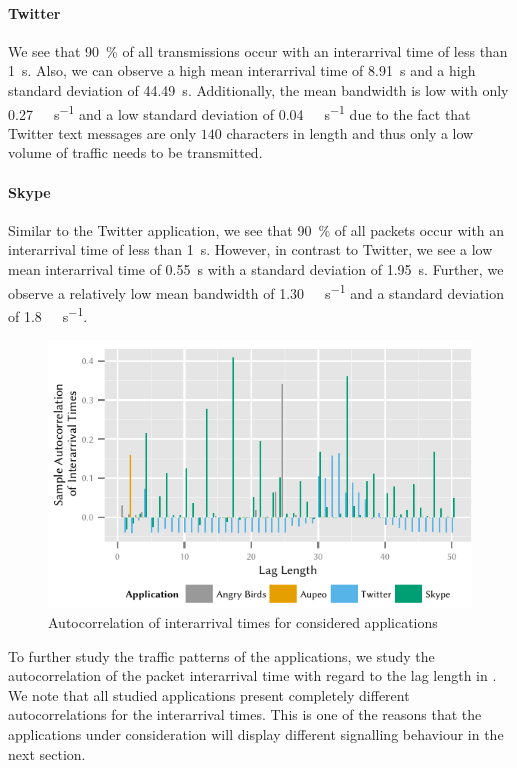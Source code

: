 \paragraph*{Twitter}
We see that \SI{90}{\percent} of all transmissions occur with an interarrival time of less than \SI{1}{\second}.
Also, we can observe a high mean interarrival time of \SI{8.91}{\second} and a high standard deviation of \SI{44.49}{\second}.
Additionally, the mean bandwidth is low with only \SI{0.27}{\kilo\bit\per\second} and a low standard deviation of \SI{0.04}{\kilo\bit\per\second} due to the fact that Twitter text messages are only \(140\) characters in length and thus only a low volume of traffic needs to be transmitted.

\paragraph*{Skype}
Similar to the Twitter application, we see that \SI{90}{\%} of all packets occur with an interarrival time of less than \SI{1}{\second}.
However, in contrast to Twitter, we see a low mean interarrival time of \SI{0.55}{\second} with a standard deviation of \SI{1.95}{\second}.
Further, we observe a relatively low mean bandwidth of \SI{1.30}{\kilo\bit\per\second} and a standard deviation of \SI{1.8}{\kilo\bit\per\second}.

\begin{figure}
\centering
\includegraphics{network/network_traces/numerical_results/figures/autocorrelation}
\caption{Autocorrelation of interarrival times for considered applications}\label{fig:network:network_traces:numerical_results:traffic:autocorrelation}
\end{figure}

To further study the traffic patterns of the applications, we study the autocorrelation of the packet interarrival time with regard to the lag length in .
We note that all studied applications present completely different autocorrelations for the interarrival times.
This is one of the reasons that the applications under consideration will display different signalling behaviour in the next section.

